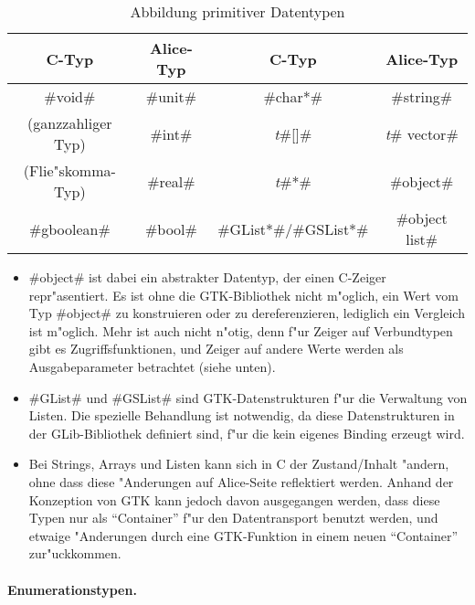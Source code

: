 \documentclass[a4paper,titlepage]{article}
\begin{document}
\begin{table}
\begin{center}
  \begin{tabular}{|c|c||c|c|}
  \hline \textbf{C-Typ}     & \textbf{Alice-Typ} &
         \textbf{C-Typ}     & \textbf{Alice-Typ}\\
  \hline #void#             & #unit# & #char*#            & #string#     \\
  \hline (ganzzahliger Typ) & #int#  & \emph{t}#[]#       & \emph{t}# vector#\\
  \hline (Flie"skomma-Typ)  & #real# & \emph{t}#*#        & #object# \\
  \hline #gboolean#         & #bool# & #GList*#/#GSList*# & #object list# \\
  \hline
  \end{tabular}
\end{center}
\caption{Abbildung primitiver Datentypen}
\label{PrimTab}
\end{table}

\begin{itemize}
\item
#object# ist dabei ein abstrakter Datentyp, der einen C-Zeiger repr"asentiert.
Es ist ohne die GTK-Bibliothek nicht m"oglich, ein Wert vom Typ #object# zu
konstruieren oder zu dereferenzieren, lediglich ein Vergleich ist m"oglich.
Mehr ist auch nicht n"otig, denn f"ur Zeiger auf Verbundtypen gibt es
Zugriffsfunktionen, und Zeiger auf andere Werte werden als Ausgabeparameter
betrachtet (siehe unten).

\item 
#GList# und #GSList# sind GTK-Datenstrukturen f"ur die Verwaltung von Listen.
Die spezielle Behandlung ist notwendig, da diese Datenstrukturen in der
GLib-Bibliothek definiert sind, f"ur die kein eigenes Binding erzeugt wird.

\item
Bei Strings, Arrays und Listen kann sich in C der Zustand/Inhalt "andern,
ohne dass diese "Anderungen auf Alice-Seite reflektiert werden. Anhand der
Konzeption von GTK kann jedoch davon ausgegangen werden, dass diese Typen
nur als ``Container'' f"ur den Datentransport benutzt werden, und etwaige
"Anderungen durch eine GTK-Funktion in einem neuen ``Container'' zur"uckkommen.
\end{itemize}

\paragraph{Enumerationstypen.}
\end{document}
